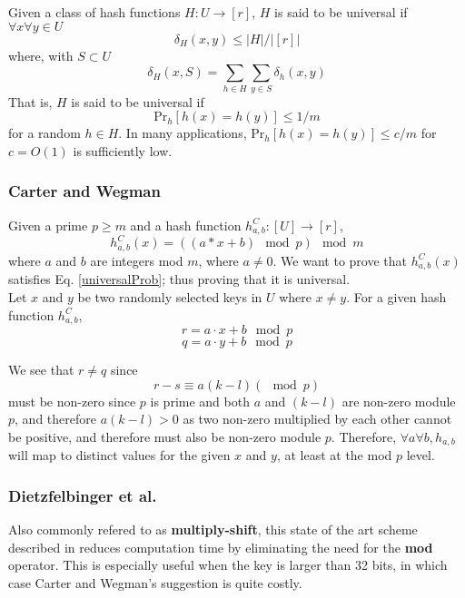 \documentclass[../../main.tex]{subfiles}
\begin{document}
Given a class of hash functions $H:U\rightarrow [r]$, $H$ is said to be universal if $\forall x \forall y \in U$
$$
	\delta_H (x,y) \leq |H|/|[r]|
$$
where, with $S\subset U$
$$
\delta_H (x,S) = \sum_{h\in H}\sum_{y\in S} \delta_h(x,y)
$$
That is, $H$ is said to be universal if 
\begin{equation}\label{universalProb}
\mathrm{Pr}_h[h(x)=h(y)]\leq 1/m
\end{equation}
for a random $h \in H$.
 In many applications, Pr$_h[h(x)=h(y)]\leq c/m$ for $c=O(1)$ is sufficiently low.

\subsubsection{Carter and Wegman\cite{carterWegman}}
Given a prime $p\geq m$ and a hash function $h_{a,b}^C:[U]\rightarrow [r]$,
\begin{equation}\label{carterhash}
h_{a,b}^{C}(x)=((a*x + b) \mod p) \mod m
\end{equation}
where $a$ and $b$ are integers mod $m$, where $a\neq 0$. We want to prove that $h_{a,b}^{C}(x)$ satisfies Eq. \ref{universalProb}; thus proving that it is universal.\\

\noindent Let $x$ and $y$ be two randomly selected keys in $U$ where $x\neq y$. For a given hash function $h_{a,b}^{C}$,
$$
r = a\cdot x + b \mod p
$$
$$
q = a \cdot y + b \mod p
$$

\noindent We see that $r\neq q$ since 
$$
r - s \equiv a(k-l) (\mod p)
$$
must be non-zero since $p$ is prime and both $a$ and $(k-l)$ are non-zero module $p$, and therefore $a(k-l) > 0$ as two non-zero multiplied by each other cannot be positive, and therefore must also be non-zero module $p$.
Therefore, $\forall a\forall b, h_{a,b}$ will map to distinct values for the given $x$ and $y$, at least at the mod $p$ level.\\



\subsubsection*{Dietzfelbinger et al.\cite{Dietzfelbinger}}
Also commonly refered to as \textbf{multiply-shift}, this state of the art scheme described in \cite{Dietzfelbinger} reduces computation time by eliminating the need for the \textbf{mod} operator. This is especially useful when the key is larger than 32 bits, in which case Carter and Wegman's suggestion is quite costly\cite{dikuHash}.\\
\end{document}
